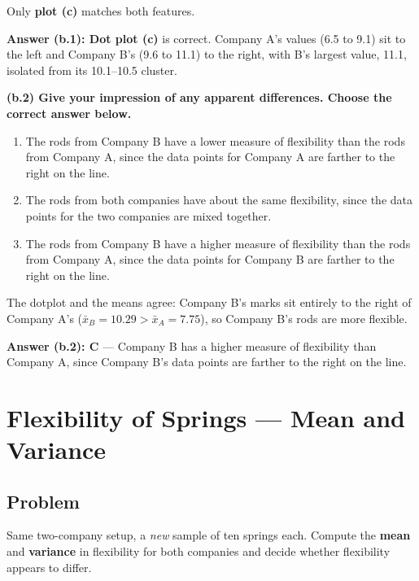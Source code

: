 \documentclass[11pt]{article}
\begin{document}
\noindent
Only \textbf{plot (c)} matches both features.

\begin{answerbox}
\textbf{Answer (b.1): Dot plot (c)} is correct. Company A's values (6.5 to 9.1)
sit to the left and Company B's (9.6 to 11.1) to the right, with B's largest
value, 11.1, isolated from its 10.1--10.5 cluster.
\end{answerbox}

\medskip
\noindent
\textbf{(b.2) Give your impression of any apparent differences. Choose the
correct answer below.}
\begin{enumerate}[label=\textbf{\Alph*.},leftmargin=2.2em,itemsep=3pt]
  \item The rods from Company B have a lower measure of flexibility than the rods
        from Company A, since the data points for Company A are farther to the
        right on the line.
  \item The rods from both companies have about the same flexibility, since the
        data points for the two companies are mixed together.
  \item The rods from Company B have a higher measure of flexibility than the rods
        from Company A, since the data points for Company B are farther to the
        right on the line.
\end{enumerate}

\noindent
The dotplot and the means agree: Company B's marks sit entirely to the right of
Company A's ($\bar{x}_B=10.29 > \bar{x}_A=7.75$), so Company B's rods are more
flexible.

\begin{answerbox}
\textbf{Answer (b.2): C} --- Company B has a higher measure of flexibility than
Company A, since Company B's data points are farther to the right on the line.
\end{answerbox}

\section{Flexibility of Springs --- Mean and Variance}

\subsection*{Problem}
Same two-company setup, a \emph{new} sample of ten springs each. Compute the
\textbf{mean} and \textbf{variance} in flexibility for both companies and decide
whether flexibility appears to differ.
\end{document}
